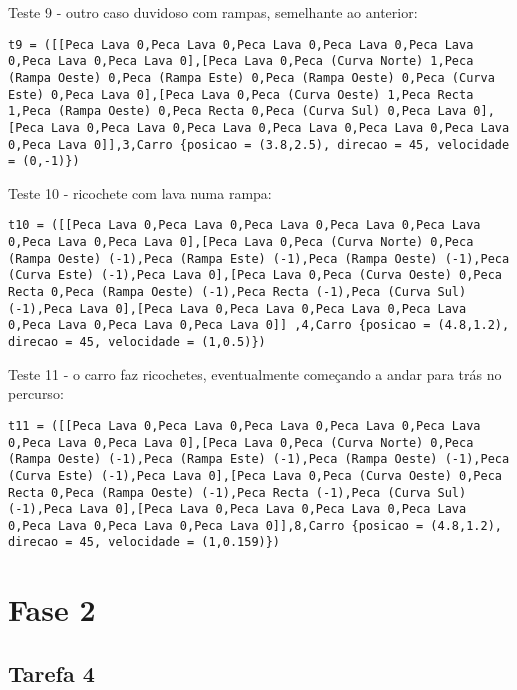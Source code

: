 \documentclass[a4paper]{report}
\begin{document}
Teste 9 - outro caso duvidoso com rampas, semelhante ao anterior:

\begin{lstlisting}
t9 = ([[Peca Lava 0,Peca Lava 0,Peca Lava 0,Peca Lava 0,Peca Lava 0,Peca Lava 0,Peca Lava 0],[Peca Lava 0,Peca (Curva Norte) 1,Peca (Rampa Oeste) 0,Peca (Rampa Este) 0,Peca (Rampa Oeste) 0,Peca (Curva Este) 0,Peca Lava 0],[Peca Lava 0,Peca (Curva Oeste) 1,Peca Recta 1,Peca (Rampa Oeste) 0,Peca Recta 0,Peca (Curva Sul) 0,Peca Lava 0],[Peca Lava 0,Peca Lava 0,Peca Lava 0,Peca Lava 0,Peca Lava 0,Peca Lava 0,Peca Lava 0]],3,Carro {posicao = (3.8,2.5), direcao = 45, velocidade = (0,-1)})
\end{lstlisting}

Teste 10 - ricochete com lava numa rampa:

\begin{lstlisting}
t10 = ([[Peca Lava 0,Peca Lava 0,Peca Lava 0,Peca Lava 0,Peca Lava 0,Peca Lava 0,Peca Lava 0],[Peca Lava 0,Peca (Curva Norte) 0,Peca (Rampa Oeste) (-1),Peca (Rampa Este) (-1),Peca (Rampa Oeste) (-1),Peca (Curva Este) (-1),Peca Lava 0],[Peca Lava 0,Peca (Curva Oeste) 0,Peca Recta 0,Peca (Rampa Oeste) (-1),Peca Recta (-1),Peca (Curva Sul) (-1),Peca Lava 0],[Peca Lava 0,Peca Lava 0,Peca Lava 0,Peca Lava 0,Peca Lava 0,Peca Lava 0,Peca Lava 0]] ,4,Carro {posicao = (4.8,1.2), direcao = 45, velocidade = (1,0.5)})
\end{lstlisting}

Teste 11 - o carro faz ricochetes, eventualmente começando a andar para trás no percurso:

\begin{lstlisting}
t11 = ([[Peca Lava 0,Peca Lava 0,Peca Lava 0,Peca Lava 0,Peca Lava 0,Peca Lava 0,Peca Lava 0],[Peca Lava 0,Peca (Curva Norte) 0,Peca (Rampa Oeste) (-1),Peca (Rampa Este) (-1),Peca (Rampa Oeste) (-1),Peca (Curva Este) (-1),Peca Lava 0],[Peca Lava 0,Peca (Curva Oeste) 0,Peca Recta 0,Peca (Rampa Oeste) (-1),Peca Recta (-1),Peca (Curva Sul) (-1),Peca Lava 0],[Peca Lava 0,Peca Lava 0,Peca Lava 0,Peca Lava 0,Peca Lava 0,Peca Lava 0,Peca Lava 0]],8,Carro {posicao = (4.8,1.2), direcao = 45, velocidade = (1,0.159)})
\end{lstlisting}

\section{Fase 2}

\subsection{Tarefa 4}
\end{document}
